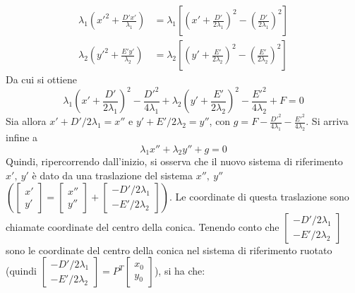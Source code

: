 \documentclass{article}
\begin{document}
        \[
            \begin{aligned} 
                \lambda_1 \left( x'^2 + \frac{D'x'}{\lambda_1} \right) &= \lambda_1 \left[\left(x' + \frac{D'}{2 \lambda_1}\right)^2 - \left( \frac{D'}{2 \lambda_1}\right)^2 \right]  \\
                \lambda_2 \left( y'^2 + \frac{E'y'}{\lambda_2} \right) &= \lambda_2 \left[\left(y' + \frac{E'}{2 \lambda_2}\right)^2 - \left( \frac{E'}{2 \lambda_2}\right)^2 \right]
            \end{aligned}
        \]
        Da cui si ottiene
        \[
            \lambda_1 \left(x' + \frac{D'}{2 \lambda_1}\right)^2 - \frac{D'^2}{4 \lambda_1} + \lambda_2 \left(y' + \frac{E'}{2 \lambda_2}\right)^2 - \frac{E'^2}{4 \lambda_2} + F = 0
        \]
        Sia allora $x' + D '/ 2 \lambda_1 = x''$ e $y' + E' / 2 \lambda_2 = y''$, con $g = F - \frac{D'^2}{4 \lambda_1} - \frac{E'^2}{4 \lambda_2}$. Si arriva infine a
        \[
            \lambda_1 x'' + \lambda_2 y'' + g = 0
        \]
        Quindi, ripercorrendo dall'inizio, si osserva che il nuovo sistema di riferimento $x', \: y'$ è dato da una traslazione del sistema $x'', \: y''$ $\left( \begin{bmatrix} x' \\ y' \end{bmatrix} = \begin{bmatrix} x'' \\ y'' \end{bmatrix} + \begin{bmatrix} - D' / 2 \lambda_1 \\ - E' / 2 \lambda_2 \end{bmatrix} \right)$. Le coordinate di questa traslazione sono chiamate coordinate del centro della conica. 
        Tenendo conto che $\begin{bmatrix} - D' / 2 \lambda_1 \\ - E' / 2 \lambda_2 \end{bmatrix}$ sono le coordinate del centro della conica nel sistema di riferimento ruotato (quindi $\begin{bmatrix} - D' / 2 \lambda_1 \\ - E' / 2 \lambda_2 \end{bmatrix} = P^{T} \begin{bmatrix} x_0 \\ y_0 \end{bmatrix}$), si ha che:
\end{document}
